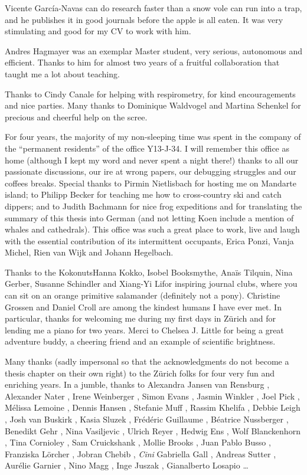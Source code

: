 Vicente Garc\'ia-Navas can do research faster than a snow vole can run into a trap, and he publishes it in good journals before the apple is all eaten. It was very stimulating and good for my CV to work with him. 

Andres Hagmayer was an exemplar Master student, very serious, autonomous and efficient. Thanks to him for almost two years of a fruitful collaboration that taught me a lot about teaching. 

Thanks to Cindy Canale for helping with respirometry, for kind encouragements and nice parties. 
Many thanks to Dominique Waldvogel and Martina Schenkel for precious and cheerful help on the scree. 

For four years, the majority of my non-sleeping time was spent in the company of the ``permanent residents'' of the office Y13-J-34. I will remember this office as home (although I kept my word and never spent a night there!) thanks to all our passionate discussions, our ire at wrong papers, our debugging struggles and our coffees breaks. Special thanks to Pirmin Nietlisbach for hosting me on Mandarte island; to Philipp Becker for teaching me how to cross-country ski and catch dippers; and to Judith Bachmann for nice frog expeditions and for translating the summary of this thesis into German (and not letting Koen include a mention of whales and cathedrals). 
This office was such a great place to work, live and laugh with the essential contribution of its intermittent occupants,
Erica Ponzi, 
Vanja Michel, 
Rien van Wijk and 
Johann Hegelbach.


Thanks to the Kokonuts\textemdash Hanna Kokko, Isobel Booksmythe, Ana\"is Tilquin, Nina Gerber, Susanne Schindler and Xiang-Yi Li\textemdash for inspiring journal clubs, where you can sit on an orange primitive salamander (definitely not a pony).
Christine Grossen and Daniel Croll are among the kindest humans I have ever met. In particular, thanks for welcoming me during my first days in Z\"urich and for lending me a piano for two years.
Merci to Chelsea J. Little for being a great adventure buddy, a cheering friend and an example of scientific brightness. 

Many thanks (sadly impersonal so that the acknowledgments do not become a thesis chapter on their own right) to the Z\"urich folks for four very fun and enriching years. In a jumble, thanks to 
Alexandra Jansen van Rensburg 
, Alexander Nater
, Irene Weinberger
, Simon Evans
, Jasmin Winkler
, Joel Pick
, M\'elissa Lemoine
, Dennis Hansen
, Stefanie Muff
, Rassim Khelifa
, Debbie Leigh
, Josh van Buskirk 
, Kasia Sluzek
, Fr\'ed\'eric Guillaume
, Béatrice Nussberger
, Benedikt Gehr	
, Nina Vasiljevic
, Ulrich Reyer
, Hedwig Ens
, Wolf Blanckenhorn
, Tina Cornioley
, Sam Cruickshank
, Mollie Brooks
, Juan Pablo Busso
, Franziska L\"orcher
, Jobran Chebib
, \emph{Cini} Gabriella Gall
, Andreas Sutter
, Aur\'elie Garnier
, Nino Magg
, Inge Juszak
, Gianalberto Losapio
\dots

